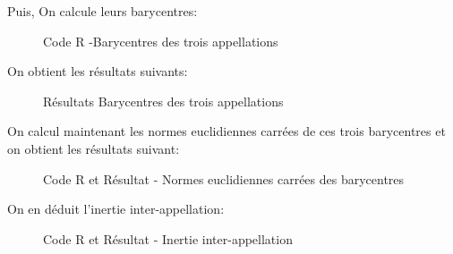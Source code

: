 Puis, On calcule leurs barycentres:

\begin{figure}[h]
\centering
{}
\caption{Code R -Barycentres des trois appellations}
\end{figure}

On obtient les résultats suivants:

\begin{figure}[h]
\centering
{}
\caption{Résultats Barycentres des trois appellations}
\end{figure}

\newpage

On calcul maintenant les normes euclidiennes carrées de ces trois barycentres et on obtient les résultats suivant:

\begin{figure}[h]
\centering
{}
\caption{Code R et Résultat - Normes euclidiennes carrées des barycentres}
\end{figure}

On en déduit l'inertie inter-appellation:
\begin{figure}[h]
\centering
{}
\caption{Code R et Résultat - Inertie inter-appellation}
\end{figure}

